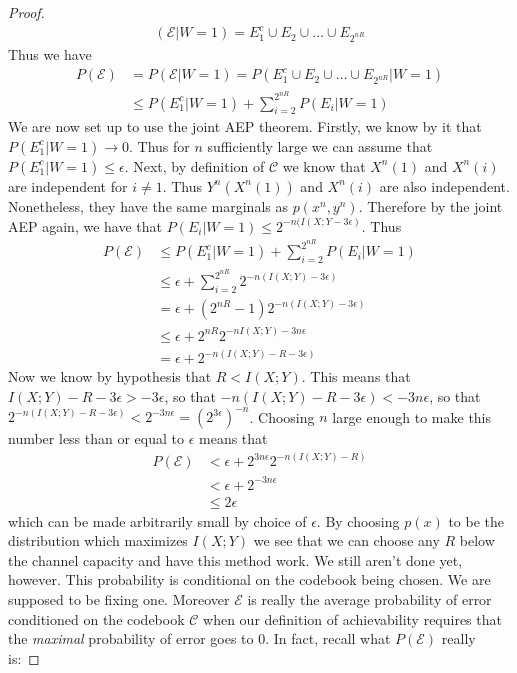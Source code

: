 \begin{proof}
\begin{align}
	(\mathcal{E}|W=1) = E_1^c \cup E_2 \cup \ldots \cup E_{2^{nR}}
\end{align}
Thus we have
\begin{align}
	P(\mathcal{E}) &= P(\mathcal{E}|W=1) = P(E_1^c \cup E_2 \cup \ldots \cup E_{2^{nR}}|W=1) \\
		&\leq P(E_1^c|W=1) + \sum_{i=2}^{2^{nR}}P(E_i|W=1)
\end{align}
We are now set up to use the joint AEP theorem. Firstly, we know by it that $P(E^c_1|W=1) \to 0$. Thus for $n$ sufficiently large we can assume that $P(E^c_1|W=1) \leq \epsilon$. Next, by definition of $\mathcal{C}$ we know that $X^n(1)$ and $X^n(i)$ are independent for $i \neq 1$. Thus $Y^n(X^n(1))$ and $X^n(i)$ are also independent. Nonetheless, they have the same marginals as $p(x^n,y^n)$. Therefore by the joint AEP again, we have that $P(E_i|W=1) \leq 2^{-n(I(X;Y-3\epsilon)}$. Thus
\begin{align}
	P(\mathcal{E}) &\leq P(E_1^c|W=1) + \sum_{i=2}^{2^{nR}}P(E_i|W=1) \\
				&\leq \epsilon + \sum_{i=2}^{2^{nR}}2^{-n(I(X;Y)-3\epsilon)} \\
				&= \epsilon +(2^{nR}-1)2^{-n(I(X;Y)-3\epsilon)} \\
				&\leq \epsilon + 2^{nR}2^{-nI(X;Y)-3n\epsilon} \\
				&= \epsilon + 2^{-n(I(X;Y)-R-3\epsilon)}
\end{align}
Now we know by hypothesis that $R < I(X;Y)$. This means that $I(X;Y)-R-3\epsilon > -3\epsilon$, so that $-n(I(X;Y)-R-3\epsilon)<-3n\epsilon$, so that $2^{-n(I(X;Y)-R-3\epsilon)} < 2^{-3n\epsilon} = (2^{3\epsilon})^{-n}$. Choosing $n$ large enough to make this number less than or equal to $\epsilon$ means that 
\begin{align}
	P(\mathcal{E}) &< \epsilon + 2^{3n\epsilon}2^{-n(I(X;Y)-R)} \\
				&<\epsilon + 2^{-3n\epsilon} \\
				&\leq 2\epsilon
\end{align}
which can be made arbitrarily small by choice of $\epsilon$. By choosing $p(x)$ to be the distribution which maximizes $I(X;Y)$ we see that we can choose any $R$ below the channel capacity and have this method work. We still aren't done yet, however. This probability is conditional on the codebook being chosen. We are supposed to be fixing one. Moreover $\mathcal{E}$ is really the average probability of error conditioned on the codebook $\mathcal{C}$ when our definition of achievability requires that the \emph{maximal} probability of error goes to $0$. In fact, recall what $P(\mathcal{E})$ really is:

\end{proof}
